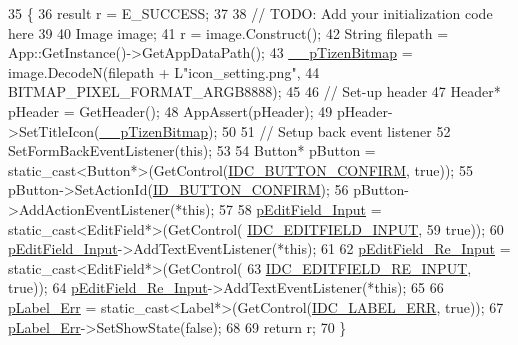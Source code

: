 \begin{DoxyCode}
35                                                \{
36     result r = E\_SUCCESS;
37 
38     \textcolor{comment}{// TODO: Add your initialization code here}
39 
40     Image image;
41     r = image.Construct();
42     String filepath = App::GetInstance()->GetAppDataPath();
43     \hyperlink{class_setting_password_form_a60cc925eb42ef6db4a87fb7ed831443e}{\_\_pTizenBitmap} = image.DecodeN(filepath + L\textcolor{stringliteral}{"icon\_setting.png"},
44             BITMAP\_PIXEL\_FORMAT\_ARGB8888);
45 
46     \textcolor{comment}{// Set-up header}
47     Header* pHeader = GetHeader();
48     AppAssert(pHeader);
49     pHeader->SetTitleIcon(\hyperlink{class_setting_password_form_a60cc925eb42ef6db4a87fb7ed831443e}{\_\_pTizenBitmap});
50 
51     \textcolor{comment}{// Setup back event listener}
52     SetFormBackEventListener(\textcolor{keyword}{this});
53 
54     Button* pButton = \textcolor{keyword}{static\_cast<}Button*\textcolor{keyword}{>}(GetControl(\hyperlink{_app_resource_id_8h_ab1d420169ff9a0d1dea32ec305d8b8af}{IDC\_BUTTON\_CONFIRM}, \textcolor{keyword}{true}));
55     pButton->SetActionId(\hyperlink{class_setting_password_form_ac831ee19d4e476224c2ee4bd87df8a0b}{ID\_BUTTON\_CONFIRM});
56     pButton->AddActionEventListener(*\textcolor{keyword}{this});
57 
58     \hyperlink{class_setting_password_form_a2cd9d5f0b6101f19f47dbf6c6d268d71}{pEditField\_Input} = \textcolor{keyword}{static\_cast<}EditField*\textcolor{keyword}{>}(GetControl(
      \hyperlink{_app_resource_id_8h_a7950d3060166d1583a75bae4daf9c70c}{IDC\_EDITFIELD\_INPUT},
59             \textcolor{keyword}{true}));
60     \hyperlink{class_setting_password_form_a2cd9d5f0b6101f19f47dbf6c6d268d71}{pEditField\_Input}->AddTextEventListener(*\textcolor{keyword}{this});
61 
62     \hyperlink{class_setting_password_form_a45848a36b44d294a9e7ddd1d921c990d}{pEditField\_Re\_Input} = \textcolor{keyword}{static\_cast<}EditField*\textcolor{keyword}{>}(GetControl(
63             \hyperlink{_app_resource_id_8h_af5a1a16135174b8519510187bd434333}{IDC\_EDITFIELD\_RE\_INPUT}, \textcolor{keyword}{true}));
64     \hyperlink{class_setting_password_form_a45848a36b44d294a9e7ddd1d921c990d}{pEditField\_Re\_Input}->AddTextEventListener(*\textcolor{keyword}{this});
65 
66     \hyperlink{class_setting_password_form_a2cddadd3fdd619dc859566a6fde37c23}{pLabel\_Err} = \textcolor{keyword}{static\_cast<}Label*\textcolor{keyword}{>}(GetControl(\hyperlink{_app_resource_id_8h_a03ed148cf7e05f1528a723fd55704a5b}{IDC\_LABEL\_ERR}, \textcolor{keyword}{true}));
67     \hyperlink{class_setting_password_form_a2cddadd3fdd619dc859566a6fde37c23}{pLabel\_Err}->SetShowState(\textcolor{keyword}{false});
68 
69     \textcolor{keywordflow}{return} r;
70 \}
\end{DoxyCode}
